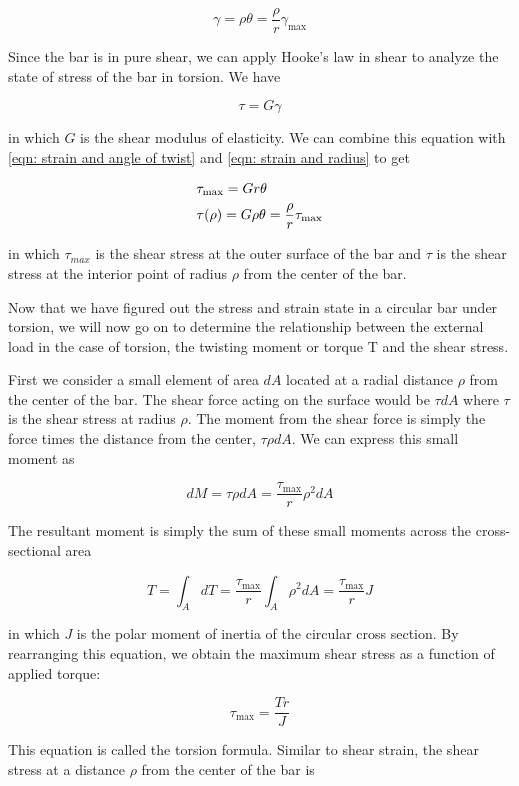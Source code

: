\documentclass[a4paper,openany,nobib]{tufte-book}
\begin{document}
$$ \gamma  = \rho \theta  = \frac{\rho }{r}\gamma _{\max }$$

Since the bar is in pure shear, we can apply Hooke's law in shear to
analyze the state of stress of the bar in torsion. We have

$$\tau  = G\gamma$$

in which \(G\) is the shear modulus of elasticity. We can combine this
equation with \ref{eqn: strain and angle of twist} and \ref{eqn: strain and radius} to get

$$\begin{gathered}
    \tau _{\max } = Gr\theta  \hfill \\
    \tau (\rho ) = G\rho \theta  = \dfrac{\rho }{r}\tau _{\max } \hfill \\ 
  \end{gathered}$$

in which \(\tau_{max}\) is the shear stress at the outer surface of the
bar and \(\tau\) is the shear stress at the interior point of radius
\(\rho\) from the center of the bar.

Now that we have figured out the stress and strain state in a circular
bar under torsion, we will now go on to determine the relationship
between the external load in the case of torsion, the twisting moment or
torque T and the shear stress.

First we consider a small element of area \(dA\) located at a radial
distance \(\rho\) from the center of the bar. The shear force acting on
the surface would be \(\tau dA\) where \(\tau\) is the shear stress at
radius \(\rho\). The moment from the shear force is simply the force times
the distance from the center, \(\tau \rho dA\). We can express this small
moment as

$$dM = \tau \rho dA = \frac{\tau _{\max }}{r}\rho ^2dA$$

The resultant moment is simply the sum of these small moments across the
cross-sectional area


$$T = \int_A {dT}  = \frac{\tau _{\max }}{r}\int_A \rho ^2dA  = \frac{\tau _{\max }}{r}J$$

in which \(J\) is the polar moment of inertia of the circular cross
section. By rearranging this equation, we obtain the maximum shear
stress as a function of applied torque:

$$\tau _{\max } = \frac{Tr}{J}$$

This equation is called the torsion formula. Similar to shear strain,
the shear stress at a distance \(\rho\) from the center of the bar is
\end{document}
